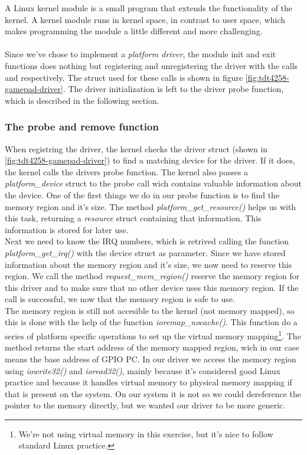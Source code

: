 A Linux kernel module is a small program that extends the functionality of the kernel. A kernel module runs in kernel space, in contrast to user space, which makes programming the module a little different and more challenging.\\
\\
Since we've chose to implement a \emph{platform driver}, the module init and exit functions does nothing but registering and unregistering the driver with the calls  and  respectively. The struct used for these calls is shown in figure \ref{fig:tdt4258-gamepad-driver}. The driver initialization is left to the driver probe function, which is described in the following section. 

\subsubsection{The probe and remove function}

When registring the driver, the kernel checks the driver struct (shown in \ref{fig:tdt4258-gamepad-driver}) to find a matching device for the driver. If it does, the kernel calls the drivers probe function. The kernel also passes a \emph{platform\_device} struct to the probe call wich contains valuable information about the device. One of the first things we do in our probe function is to find the memory region and it's size. The method \emph{platform\_get\_resource()} helps us with this task, returning a \emph{resource} struct containing that information. This information is stored for later use. \\

Next we need to know the IRQ numbers, which is retrived calling the function \emph{platform\_get\_irq()} with the device struct as parameter. Since we have stored information about the memory region and it's size, we now need to reserve this region. We call the method \emph{request\_mem\_region()} reserve the memory region for this driver and to make sure that no other device uses this memory region. If the call is successful, we now that the memory region is safe to use.  \\

The memory region is still not accesible to the kernel (not memory mapped), so this is done with the help of the function \emph{ioremap\_nocache()}. This function do a series of platform specific operations to set up the virtual memory mapping\footnote{We're not using virtual memory in this exercise, but it's nice to follow standard Linux practice.}. The method returns the start address of the memory mapped region, wich in our case means the base address of GPIO PC. In our driver we access the memory region using \emph{iowrite32()} and \emph{ioread32()}, mainly because it's considered good Linux practice and because it handles virtual memory to physical memory mapping if that is present on the system. On our system it is not so we could dereference the pointer to the memory directly, but we wanted our driver to be more generic. \\




